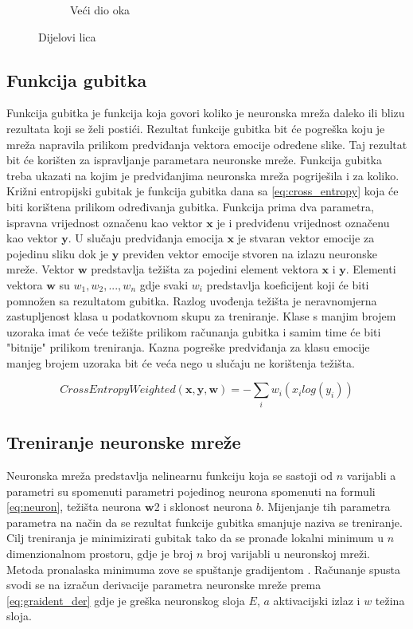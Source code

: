 \documentclass[times, utf8, zavrsni,numeric,pstricks]{fer}
\newcommand{\vect}[1]{\boldsymbol{#1}}
\begin{document}
\begin{figure}[H]
\begin{subfigure}[b]{0.5\linewidth}
		\caption{Veći dio oka}
	\end{subfigure}	
	\caption{Dijelovi lica}	
	\label{fig:npy_array}
\end{figure}




\subsection{Funkcija gubitka}\label{loss_function}
Funkcija gubitka  je funkcija koja govori koliko je neuronska mreža daleko ili blizu rezultata koji se želi postići. Rezultat funkcije gubitka bit će pogreška koju je mreža napravila prilikom predviđanja vektora emocije određene slike. Taj rezultat bit će korišten za ispravljanje parametara neuronske mreže. Funkcija gubitka treba ukazati na kojim je predviđanjima neuronska mreža pogriješila i za koliko. Križni entropijski gubitak  je funkcija gubitka dana sa \ref{eq:cross_entropy} koja će biti korištena prilikom određivanja gubitka. Funkcija prima dva parametra, ispravna vrijednost označenu kao vektor $\vect{x}$ je i predviđenu vrijednost označenu kao vektor $\vect{y}$. U slučaju predviđanja emocija $\vect{x}$ je stvaran vektor emocije za pojedinu sliku dok je $\vect{y}$ previđen vektor emocije stvoren na izlazu neuronske mreže. Vektor $\vect{w}$ predstavlja težišta za pojedini element vektora $\vect{x}$ i $\vect{y}$. Elementi vektora $\vect{w}$ su $w_1, w_2, ..., w_n$ gdje svaki $w_i$ predstavlja koeficijent koji će biti pomnožen sa rezultatom gubitka. Razlog uvođenja težišta je neravnomjerna zastupljenost klasa u podatkovnom skupu za treniranje. Klase s manjim brojem uzoraka imat će veće težište prilikom računanja gubitka i samim time će biti "bitnije" prilikom treniranja. Kazna pogreške predviđanja za klasu emocije manjeg brojem uzoraka bit će veća nego u slučaju ne korištenja težišta. 

\begin{equation}\label{eq:cross_entropy}
	CrossEntropyWeighted\left(\vect{x}, \vect{y},\vect{w}\right) =
		-\sum_i w_i \left( x_i log\left(y_i \right)\right)
\end{equation}

\subsection{Treniranje neuronske mreže}\label{nn_train}

Neuronska mreža predstavlja nelinearnu funkciju koja se sastoji od $n$ varijabli a parametri su spomenuti parametri pojedinog neurona spomenuti na formuli \ref{eq:neuron}, težišta neurona $\vect{w}$2 i sklonost neurona $b$. Mijenjanje tih parametra parametra na način da se rezultat funkcije gubitka smanjuje naziva se treniranje. Cilj treniranja je minimizirati gubitak tako da se pronađe lokalni minimum u $n$ dimenzionalnom prostoru, gdje je broj $n$ broj varijabli u neuronskoj mreži. Metoda pronalaska minimuma zove se spuštanje gradijentom . Računanje spusta svodi se na izračun derivacije parametra neuronske mreže prema \ref{eq:graident_der} gdje je greška neuronskog sloja $E$, $a$ aktivacijski izlaz  i $w$ težina sloja.
\end{document}
